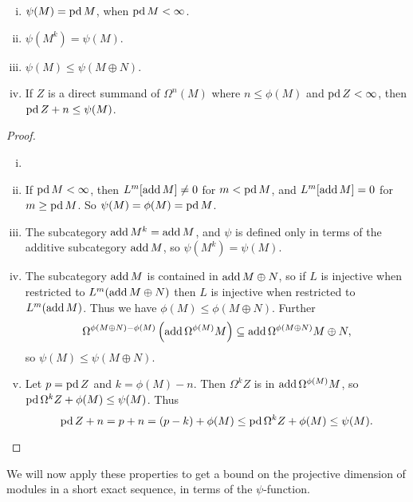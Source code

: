 \begin{lemma} \cite[Lemma~3]{IgTo05} \label{lem:properties_of_psi}
	\begin{enumerate}[i)]
		\item $\psi(M) = \operatorname{pd} M$, when $\operatorname{pd} M < \infty$.
		\item $\psi(M^k) = \psi(M)$.
		\item $\psi(M) \leq \psi(M\oplus N)$.
		\item If $Z$ is a direct summand of $\Omega^n(M)$ where $n \leq \phi(M)$ and $\operatorname{pd} Z < \infty$, then $\operatorname{pd} Z + n \leq \psi(M)$.
	\end{enumerate}
	\begin{proof}
		\begin{enumerate}[i)]
			\item[] %
			\item If $\operatorname{pd} M < \infty$, then $L^m[\operatorname{add} M] \neq 0$ for $m < \operatorname{pd} M$, and $L^m[\operatorname{add} M] =0$ for $m \geq \operatorname{pd} M$. So $\psi(M)=\phi(M)=\operatorname{pd} M$.
			\item The subcategory $\operatorname{add} M^k = \operatorname{add} M$, and $\psi$ is defined only in terms of the additive subcategory $\operatorname{add} M$, so $\psi(M^k)=\psi(M)$.
			\item  The subcategory $\operatorname{add} M$ is contained in $\operatorname{add} M\oplus N$, so if $L$ is injective when restricted to $L^m(\operatorname{add} M\oplus N)$ then $L$ is injective when restricted to $L^m(\operatorname{add} M)$. Thus we have $\phi(M) \leq \phi({M\oplus N})$. Further $$\Omega^{\phi({M\oplus N})-\phi(M)}\left(\operatorname{add}\Omega^{\phi(M)}M \right) \subseteq \operatorname{add}\Omega^{\phi({M\oplus N})} M\oplus N,$$ 
			so $\psi(M) \leq \psi(M\oplus N)$.
			\item Let $p=\operatorname{pd} Z$ and $k = \phi(M) - n$. Then $\Omega^k Z$ is in $\operatorname{add} \Omega^{\phi(M)}M$, so $\operatorname{pd}\Omega^k Z + \phi(M) \leq \psi(M)$. Thus $$\operatorname{pd} Z + n = p + n = (p-k) + \phi(M) \leq \operatorname{pd}\Omega^k Z + \phi(M) \leq \psi(M).$$
		\end{enumerate}
	\end{proof}
\end{lemma}

We will now apply these properties to get a bound on the projective dimension of modules in a short exact sequence, in terms of the $\psi$-function.

